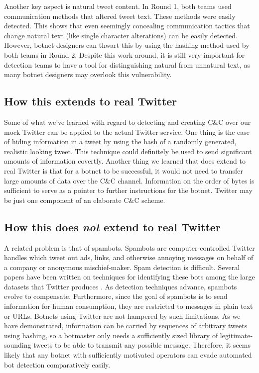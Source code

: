 \documentclass[11pt, oneside]{article} %
\numberwithin{equation}{section} %
\numberwithin{figure}{section} %
\numberwithin{table}{section} %
\begin{document}
		Another key aspect is natural tweet content. In Round 1, both teams used communication methods that altered tweet text. These methods were easily detected. This shows that even seemingly concealing communication tactics that change natural text (like single character alterations) can be easily detected. However, botnet designers can thwart this by using the hashing method used by both teams in Round 2. Despite this work around, it is still very important for detection teams to have a tool for distinguishing natural from unnatural text, as many botnet designers may overlook this vulnerability.

	\subsection{How this extends to real Twitter}
	Some of what we've learned with regard to detecting and creating C\&C over our mock Twitter can be applied to the actual Twitter service. One thing is the ease of hiding information in a tweet by using the hash of a randomly generated, realistic looking tweet. This technique could definitely be used to send significant amounts of information covertly. Another thing we learned that does extend to real Twitter is that for a botnet to be successful, it would not need to transfer large amounts of data over the C\&C channel. Information on the order of bytes is sufficient to serve as a pointer to further instructions for the botnet. Twitter may be just one component of an elaborate C\&C scheme.

	\subsection{How this does \textit{not} extend to real Twitter}
    A related problem is that of spambots. Spambots are computer-controlled Twitter handles which tweet out ads, links, and otherwise annoying messages on behalf of a company or anonymous mischief-maker. Spam detection is difficult. Several papers have been written on techniques for identifying these bots among the large datasets that Twitter produces \cite{botdetect, spambotML, socialnet_spam}. As detection techniques advance, spambots evolve to compensate. Furthermore, since the goal of spambots is to send information for human consumption, they are restricted to messages in plain text or URLs. Botnets using Twitter are not hampered by such limitations. As  we have demonstrated, information can be carried by sequences of arbitrary  tweets using hashing, so a botmaster only needs a sufficiently sized  library of legitimate-sounding tweets to be able to transmit any possible message. Therefore, it seems likely that any botnet with sufficiently motivated operators can evade automated bot detection comparatively easily.
 
\end{document}
